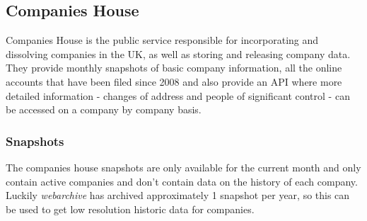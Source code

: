 \documentclass[a4paper,10pt]{article}
\begin{document}
   \subsection{Companies House}
   Companies House is the public service responsible for incorporating and dissolving companies in the UK, as well as storing and releasing company data. They provide monthly snapshots of basic company information, all the online accounts that have been filed since 2008 and also provide an API where more detailed information - changes of address and people of significant control - can be accessed on a company by company basis.
   \subsubsection{Snapshots}
   The companies house snapshots \cite{companieshousesnapshots} are only available for the current month and only contain active companies and don't contain data on the history of each company. Luckily \emph{webarchive} \cite{snapshotarchive} has archived approximately 1 snapshot per year, so this can be used to get low resolution historic data for companies. 
\end{document}
